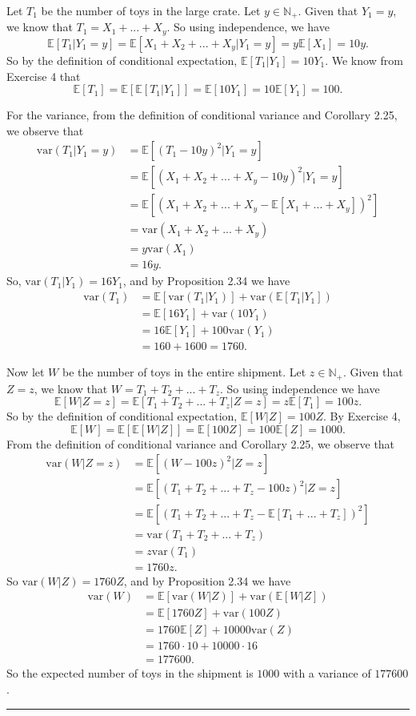 \documentclass{article}
\theoremstyle{break}
\newenvironment{solution}{{\bf Solution:}}{\hfill\rule{2mm}{2mm}}
\newcommand{\E}{\mathbb{E}}
\newcommand{\var}{\mathrm{var}}
\newcommand{\N}{\mathbb{N}}
\begin{document}
\begin{solution}

Let $T_1$ be the number of toys in the large crate. Let $y \in \N_+$. Given that $Y_1 = y$, we know that $T_1 = X_1 + ... + X_y$. So using independence, we have 
\[
\E[T_1 | Y_1 = y ] = \E[X_1 + X_2 + ... + X_y | Y_1 = y ]	= y \E[X_1]
	= 10y. \]
So by the definition of conditional expectation, $\E[T_1 | Y_1] = 10Y_1$.
We know from Exercise 4 that 
\[ \E[T_1] = \E[ \E[ T_1 | Y_1 ]] = \E [ 10Y_1] = 10 \E[Y_1] = 100. \]

For the variance, from the definition of conditional variance and Corollary 2.25, we observe that 
\begin{align*}
\var(T_1 | Y_1 = y ) &= \E[ ( T_1 - 10y)^2 | Y_1 = y ] \\
	&= \E[ ( X_1 + X_2 + ... + X_y - 10y)^2 | Y_1 = y ] \\
	&= \E[( X_1 + X_2 + ... + X_y - \E[X_1 + ... + X_y] )^2 ] \\
	&= \var(X_1 + X_2 + ... + X_y) \\
	&= y \var(X_1) \\
	&= 16y.
\end{align*}
So,  $\var(T_1 | Y_1) = 16 Y_1$, and by Proposition 2.34 we have
\begin{align*}
\var(T_1 ) &= \E[ \var(T_1|Y_1)] + \var(\E[T_1 | Y_1]) \\
	&= \E[16Y_1] + \var(10Y_1) \\
	&= 16\E[Y_1] + 100 \var(Y_1) \\
	&= 160 + 1600 = 1760.
\end{align*} 

Now let $W$ be the number of toys in the entire shipment. Let $z \in \N_+$. Given that $Z = z$, we know that $W = T_1 + T_2 + ... + T_z$. So using independence we have
\[ \E[W | Z = z] = \E[ T_1 + T_2 + ... + T_z | Z = z] = z \E[T_1] = 100z.\]
So by the definition of conditional expectation, $\E[W | Z] = 100Z$. By Exercise 4, 
\[ \E[W] = \E [ \E[ W | Z ]] = \E[100Z] = 100 \E[Z] = 1000. \]
From the definition of conditional variance and Corollary 2.25, we observe that
\begin{align*}
\var(W | Z = z) &= \E[ (W - 100z)^2 | Z = z] \\
	&= \E[ (T_1 + T_2 + ... + T_z - 100z)^2 | Z = z] \\
	&= \E[ (T_1 + T_2 + ... + T_z - \E[ T_1 + ... + T_z])^2] \\
	&= \var(T_1 + T_2 + ... + T_z) \\
	&= z\var(T_1) \\
	&= 1760z.
\end{align*}
So $\var(W|Z) = 1760Z$, and by Proposition 2.34 we have 
\begin{align*}
\var(W) &= \E[ \var(W | Z)] + \var(\E[W | Z]) \\
	&= \E[1760Z] + \var(100Z) \\
	&= 1760 \E[Z] + 10000 \var(Z) \\
	&= 1760 \cdot 10 + 10000 \cdot 16 \\
	&= 177600.
\end{align*}
So the expected number of toys in the shipment is $1000$ with a variance of $177600$.
\end{solution}
\end{document}
